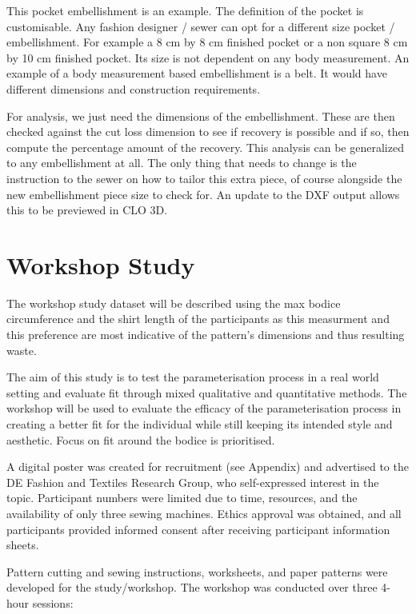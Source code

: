 This pocket embellishment is an example. The definition of the pocket is customisable. Any fashion designer / sewer can opt for a different size pocket / embellishment. For example a 8 cm by 8 cm finished pocket or a non square 8 cm by 10 cm finished pocket. Its size is not dependent on any body measurement. An example of a body measurement based embellishment is a belt. It would have different dimensions and construction requirements.

For analysis, we just need the dimensions of the embellishment. These are then checked against the cut loss dimension to see if recovery is possible and if so, then compute the percentage amount of the recovery. This analysis can be generalized to any embellishment at all. The only thing that needs to change is the instruction to the sewer on how to tailor this extra piece, of course alongside the new embellishment piece size to check for. An update to the DXF output allows this to be previewed in CLO 3D.

\section{Workshop Study}
The workshop study dataset will be described using the max bodice circumference and the shirt length of the participants as this measurment and this preference are most indicative of the pattern's dimensions and thus resulting waste.

The aim of this study is to test the parameterisation process in a real world setting and evaluate fit through mixed qualitative and quantitative methods. The workshop will be used to evaluate the efficacy of the parameterisation process in creating a better fit for the individual while still keeping its intended style and aesthetic. Focus on fit around the bodice is prioritised.

A digital poster was created for recruitment (see Appendix) and advertised to the DE Fashion and Textiles Research Group, who self-expressed interest in the topic. Participant numbers were limited due to time, resources, and the availability of only three sewing machines. Ethics approval was obtained, and all participants provided informed consent after receiving participant information sheets.

Pattern cutting and sewing instructions, worksheets, and paper patterns were developed for the study/workshop. The workshop was conducted over three 4-hour sessions:

